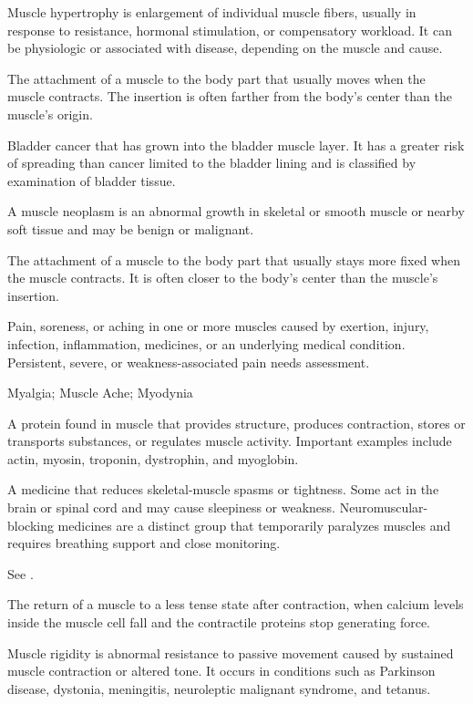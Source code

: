  Muscle hypertrophy is enlargement of individual muscle fibers, usually in response to resistance, hormonal stimulation, or compensatory workload. It can be physiologic or associated with disease, depending on the muscle and cause.

 The attachment of a muscle to the body part that usually moves when the muscle contracts. The insertion is often farther from the body’s center than the muscle’s origin.

 Bladder cancer that has grown into the bladder muscle layer. It has a greater risk of spreading than cancer limited to the bladder lining and is classified by examination of bladder tissue.

 A muscle neoplasm is an abnormal growth in skeletal or smooth muscle or nearby soft tissue and may be benign or malignant.

 The attachment of a muscle to the body part that usually stays more fixed when the muscle contracts. It is often closer to the body’s center than the muscle’s insertion.

 Pain, soreness, or aching in one or more muscles caused by exertion, injury, infection, inflammation, medicines, or an underlying medical condition. Persistent, severe, or weakness-associated pain needs assessment.

\synonyms
Myalgia; Muscle Ache; Myodynia

 A protein found in muscle that provides structure, produces contraction, stores or transports substances, or regulates muscle activity. Important examples include actin, myosin, troponin, dystrophin, and myoglobin.

 A medicine that reduces skeletal-muscle spasms or tightness. Some act in the brain or spinal cord and may cause sleepiness or weakness. Neuromuscular-blocking medicines are a distinct group that temporarily paralyzes muscles and requires breathing support and close monitoring.

 See .

 The return of a muscle to a less tense state after contraction, when calcium levels inside the muscle cell fall and the contractile proteins stop generating force.

 Muscle rigidity is abnormal resistance to passive movement caused by sustained muscle contraction or altered tone. It occurs in conditions such as Parkinson disease, dystonia, meningitis, neuroleptic malignant syndrome, and tetanus.

